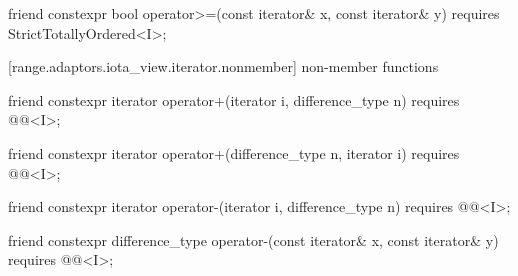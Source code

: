 \begin{itemdecl}
friend constexpr bool operator>=(const iterator& x, const iterator& y)
  requires StrictTotallyOrdered<I>;
\end{itemdecl}

\begin{itemdescr}
\pnum
\oldtxt{\returns} 
\end{itemdescr}

[range.adaptors.iota_view.iterator.nonmember]{ non-member functions}

\begin{itemdecl}
friend constexpr iterator operator+(iterator i, difference_type n)
  requires @@<I>;
\end{itemdecl}

\begin{itemdescr}
\pnum
\oldtxt{\returns} 
\end{itemdescr}

\begin{itemdecl}
friend constexpr iterator operator+(difference_type n, iterator i)
  requires @@<I>;
\end{itemdecl}

\begin{itemdescr}
\pnum
\oldtxt{\returns} 
\end{itemdescr}

\begin{itemdecl}
friend constexpr iterator operator-(iterator i, difference_type n)
  requires @@<I>;
\end{itemdecl}

\begin{itemdescr}
\pnum
\oldtxt{\returns} 
\end{itemdescr}

\begin{itemdecl}
friend constexpr difference_type operator-(const iterator& x, const iterator& y)
  requires @@<I>;
\end{itemdecl}

